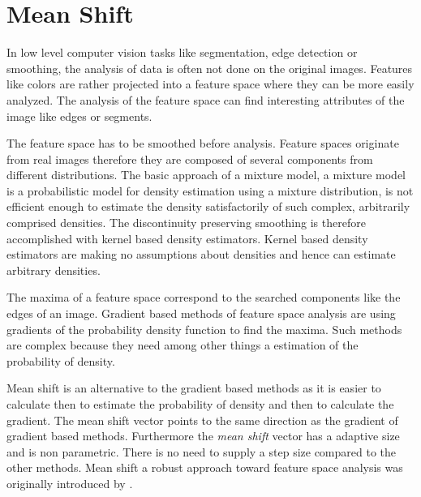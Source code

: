 \chapter{Mean Shift}\label{ch:mean_shift}
In low level computer vision tasks like segmentation, edge detection or
smoothing, the analysis of data is often not done on the original images.
Features like colors are rather projected into a feature space where they can be
more easily analyzed. The analysis of the feature space can find interesting
attributes of the image like edges or segments.

The feature space has to be smoothed before analysis. Feature spaces originate
from real images therefore they are composed of several components from
different distributions. The basic approach of a mixture model, a mixture model
is a probabilistic model for density estimation using a mixture distribution, is
not efficient enough to estimate the density satisfactorily of such complex,
arbitrarily comprised densities. The discontinuity preserving smoothing is therefore
accomplished with kernel based density estimators. Kernel based density estimators
are making no assumptions about densities and hence can estimate arbitrary 
densities.

The maxima of a feature space correspond to the searched components like the
edges of an image. Gradient based methods of feature space analysis are using
gradients of the probability density function to find the maxima. Such methods
are complex because they need among other things a estimation of the probability
of density.

Mean shift is an alternative to the gradient based methods as it is easier to
calculate then to estimate the probability of density and then to calculate the
gradient. The mean shift vector points to the same direction as the gradient of
gradient based methods. Furthermore the \emph{mean shift} vector has a adaptive
size and is non parametric. There is no need to supply a step size compared to
the other methods. Mean shift a robust approach toward feature space analysis
was originally introduced by \citeauthor{citeulike:462300}
\citep{citeulike:462300}.

